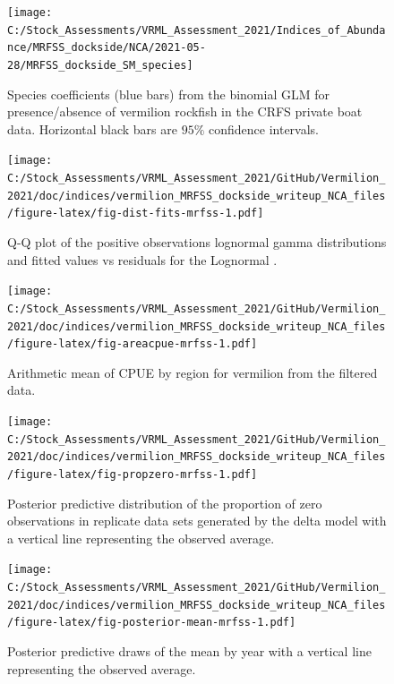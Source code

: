 \documentclass[
  english,
  a4paper,
]{article}
\begin{document}
\FloatBarrier

\FloatBarrier

\begin{figure}
\texttt{[image: C:/Stock\_Assessments/VRML\_Assessment\_2021/Indices\_of\_Abundance/MRFSS\_dockside/NCA/2021-05-28/MRFSS\_dockside\_SM\_species]} \caption{Species coefficients (blue bars) from the binomial GLM for presence/absence of vermilion rockfish in the CRFS private boat data. Horizontal black bars are $95\%$ confidence intervals.}\label{fig:fig-sm-mrfss}
\end{figure}

\begin{figure}
\centering
\texttt{[image: C:/Stock\_Assessments/VRML\_Assessment\_2021/GitHub/Vermilion\_2021/doc/indices/vermilion\_MRFSS\_dockside\_writeup\_NCA\_files/figure-latex/fig-dist-fits-mrfss-1.pdf]}
\caption{\label{fig:fig-dist-fits-mrfss}Q-Q plot of the positive observations lognormal gamma distributions and fitted values vs residuals for the Lognormal .}
\end{figure}

\FloatBarrier

\begin{figure}
\centering
\texttt{[image: C:/Stock\_Assessments/VRML\_Assessment\_2021/GitHub/Vermilion\_2021/doc/indices/vermilion\_MRFSS\_dockside\_writeup\_NCA\_files/figure-latex/fig-areacpue-mrfss-1.pdf]}
\caption{\label{fig:fig-areacpue-mrfss}Arithmetic mean of CPUE by region for vermilion from the filtered data.}
\end{figure}

\begin{figure}
\centering
\texttt{[image: C:/Stock\_Assessments/VRML\_Assessment\_2021/GitHub/Vermilion\_2021/doc/indices/vermilion\_MRFSS\_dockside\_writeup\_NCA\_files/figure-latex/fig-propzero-mrfss-1.pdf]}
\caption{\label{fig:fig-propzero-mrfss}Posterior predictive distribution of the proportion of zero observations in replicate data sets generated by the delta model with a vertical line representing the observed average.}
\end{figure}

\begin{figure}
\centering
\texttt{[image: C:/Stock\_Assessments/VRML\_Assessment\_2021/GitHub/Vermilion\_2021/doc/indices/vermilion\_MRFSS\_dockside\_writeup\_NCA\_files/figure-latex/fig-posterior-mean-mrfss-1.pdf]}
\caption{\label{fig:fig-posterior-mean-mrfss}Posterior predictive draws of the mean by year with a vertical line representing the observed average.}
\end{figure}
\end{document}
